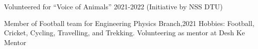 



\begin{cvskills}
  \cvskill
    {} %
    {Volunteered for “Voice of Animals” 2021-2022 (Initiative by NSS DTU)} %

  \cvskill
    {} %
    {Member of Football team for Engineering Physics Branch,2021} %
  \cvskill
    {} %
    {Hobbies: Football, Cricket, Cycling, Travelling, and Trekking.} %
 \cvskill
    {} %
    {Volunteering as mentor at Desh Ke Mentor} %

   
\end{cvskills}
